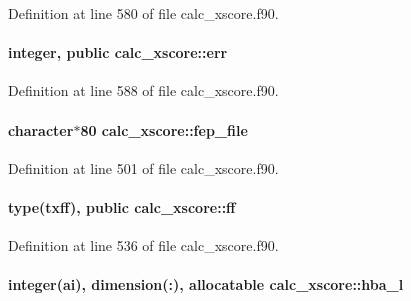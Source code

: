 Definition at line 580 of file calc\-\_\-xscore.\-f90.

\hypertarget{classcalc__xscore_ab17f107731825ab90d865fb522944051}{
\paragraph[{err}]{\setlength{\rightskip}{0pt plus 5cm}integer, public calc\-\_\-xscore\-::err}}\label{classcalc__xscore_ab17f107731825ab90d865fb522944051}


Definition at line 588 of file calc\-\_\-xscore.\-f90.

\hypertarget{classcalc__xscore_ac40449476371b2a1cf9adb8ef4ba3b4a}{
\paragraph[{fep\-\_\-file}]{\setlength{\rightskip}{0pt plus 5cm}character$\ast$80 calc\-\_\-xscore\-::fep\-\_\-file}}\label{classcalc__xscore_ac40449476371b2a1cf9adb8ef4ba3b4a}


Definition at line 501 of file calc\-\_\-xscore.\-f90.

\hypertarget{classcalc__xscore_a95d3b146435fd7fd216201f6119869c0}{
\paragraph[{ff}]{\setlength{\rightskip}{0pt plus 5cm}type({\bf txff}), public calc\-\_\-xscore\-::ff}}\label{classcalc__xscore_a95d3b146435fd7fd216201f6119869c0}


Definition at line 536 of file calc\-\_\-xscore.\-f90.

\hypertarget{classcalc__xscore_ae41e35e1394bdb773577bb2530c7789b}{
\paragraph[{hba\-\_\-l}]{\setlength{\rightskip}{0pt plus 5cm}integer(ai), dimension(\-:), allocatable calc\-\_\-xscore\-::hba\-\_\-l}}\label{classcalc__xscore_ae41e35e1394bdb773577bb2530c7789b}


